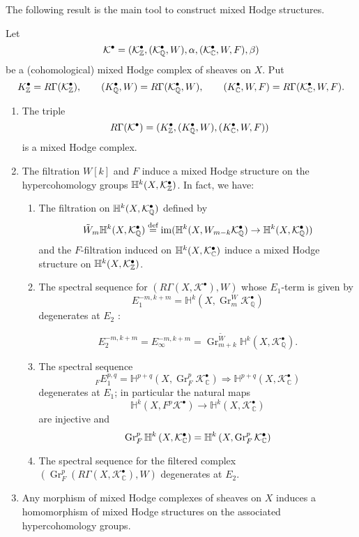 \documentclass[../main.tex]{subfiles}
\begin{document}
The following result is the main tool to construct mixed Hodge structures.
\begin{theorem}\textup{\cite[Thm. 3.18]{PS08}}\label{MainThm}
    Let 
    \[ \mathcal{K}^\bullet = (\mathcal{K}^\bullet_{\mathbb{Z}},(\mathcal{K}^\bullet_{\mathbb{Q}},W),\alpha ,(\mathcal{K}^\bullet_{\mathbb{C}},W,F),\beta )
    \]
    be a (cohomological) mixed Hodge complex of sheaves on $X$. Put
    \[ K^\bullet_{\mathbb{Z}} = R\Gamma(\mathcal{K}^\bullet_{\mathbb{Z}}), \qquad (K^\bullet_{\mathbb{Q}},W) = R\Gamma(\mathcal{K}^\bullet_{\mathbb{Q}},W), \qquad (K^\bullet_{\mathbb{C}},W,F) = R\Gamma(\mathcal{K}^\bullet_{\mathbb{C}},W,F).
    \]
    \begin{enumerate}
        \item \label{1Main} The triple 
        \[
        R\Gamma(\mathcal{K}^\bullet) = ( K^\bullet_{\mathbb{Z}}, (K^\bullet_{\mathbb{Q}},W), (K^\bullet_{\mathbb{C}},W,F) ) 
        \] is a mixed Hodge complex. 
        \item \label{2Main} The filtration $W[k]$ and $F$ induce a mixed Hodge structure on the hypercohomology groups $\mathbb{H}^k(X,\mathcal{K}_{\mathbb{Z}}^\bullet)$. In fact, we have:
        \begin{enumerate}
        \item \label{2aMain} The filtration on $\mathbb{H}^k(X,\mathcal{K}_{\mathbb{Q}}^\bullet)$ defined by 
        \[
        \tilde{W}_m\mathbb{H}^k(X,\mathcal{K}_{\mathbb{Q}}^\bullet) \stackrel{\text{def}}{=} \operatorname{im}(\mathbb{H}^k(X,W_{m-k}\mathcal{K}_{\mathbb{Q}}^\bullet) \to \mathbb{H}^k(X,\mathcal{K}_{\mathbb{Q}}^\bullet))
        \] and the $F$-filtration induced on   $\mathbb{H}^k(X,\mathcal{K}_{\mathbb{C}}^\bullet)$ induce a mixed Hodge structure on $\mathbb{H}^k(X,\mathcal{K}_{\mathbb{Z}}^\bullet)$.
        \item \label{2bMain} The spectral sequence for $\left(R \Gamma\left(X, \mathcal{K}^{\bullet}\right), W\right)$ whose $E_{1}$-term is given by
\[
E_{1}^{-m, k+m}=\mathbb{H}^{k}\left(X, \operatorname{Gr}_{m}^{W} \mathcal{K}_{\mathbb{Q}}^{\bullet}\right)
\]
degenerates at $E_{2}$ :

\[
E_{2}^{-m, k+m}  =E_{\infty}^{-m, k+m}=\operatorname{Gr}_{m+k}^{\tilde{W}} \mathbb{H}^{k}\left(X, \mathcal{K}_{\mathbb{Q}}^{\bullet}\right) .
\]
\item The spectral sequence
$$
{ }_{F} E_{1}^{p, q}=\mathbb{H}^{p+q}\left(X, \operatorname{Gr}_{F}^{p} \mathcal{K}_{\mathbb{C}}^{\bullet}\right) \Longrightarrow \mathbb{H}^{p+q}\left(X, \mathcal{K}_{\mathbb{C}}^{\bullet}\right)
$$
degenerates at $E_{1}$; in particular the natural maps
$$
\mathbb{H}^{k}\left(X, F^{p} \mathcal{K}^{\bullet}\right) \rightarrow \mathbb{H}^{k}\left(X, \mathcal{K}_{\mathbb{C}}^{\bullet}\right)
$$
are injective and
$$
\operatorname{Gr}_{F}^{p} \mathbb{H}^{k}\left(X, \mathcal{K}_{\mathbb{C}}^{\bullet}\right)=\mathbb{H}^{k}\left(X, \operatorname{Gr}_{F}^{p} \mathcal{K}_{\mathbb{C}}^{\bullet}\right)
$$
\item The spectral sequence for the filtered complex $\left(\operatorname{Gr}_{F}^{p}\left(R \Gamma\left(X, \mathcal{K}_{\mathbb{C}}^{\bullet}\right), W\right) \right.$  degenerates at $E_{2}$.

         \end{enumerate}
         \item \label{3Main} Any morphism of mixed Hodge complexes of sheaves on $X$ induces a homomorphism of mixed Hodge structures on the associated hypercohomology groups.
    \end{enumerate}

\end{theorem}
\end{document}
